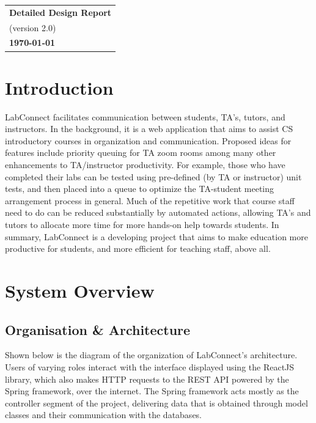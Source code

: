 \documentclass[a4paper, 12pt]{article}
\begin{document}
    \begin{table}[h!]
        \renewcommand{\arraystretch}{1.5}
        \centering
        \begin{tabular}{ |>{\centering\arraybackslash}m{15.15cm}| }
            \hline
            \Large \textbf{Detailed Design Report} \\
            \small (version 2.0) \\
            \small \textbf{\today} \\
            \hline
        \end{tabular}
    \end{table}


    \section{Introduction}

    LabConnect facilitates communication between students, TA's, tutors,
    and instructors. In the background, it is a web application
    that aims to assist CS introductory courses in organization and communication.
    Proposed ideas for features include priority queuing for TA zoom rooms among many other
    enhancements to TA/instructor productivity. For example, those who have completed their labs
    can be tested using pre-defined (by TA or instructor) unit tests,
    and then placed into a queue to optimize the TA-student meeting arrangement process in general.
    Much of the repetitive work that course staff need to do can be reduced substantially by automated actions,
    allowing TA's and tutors to allocate more time for more hands-on help towards students.
    In summary, LabConnect is a developing project that aims to make education more productive for students,
    and more efficient for teaching staff, above all.

    \section{System Overview}

    \subsection{Organisation \& Architecture}

    Shown below is the diagram of the organization of LabConnect's architecture.
    Users of varying roles interact with the interface displayed using the ReactJS library, which also makes
    HTTP requests to the REST API powered by the Spring framework, over the internet.
    The Spring framework acts mostly as the controller segment of the project, delivering data
    that is obtained through model classes and their communication with the databases.
\end{document}
